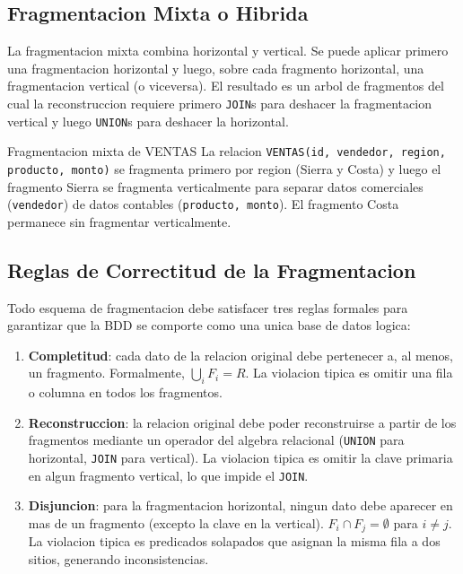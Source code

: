\documentclass[11pt,a4paper]{article}
\begin{document}
\subsection{Fragmentacion Mixta o Hibrida}

La fragmentacion mixta combina horizontal y vertical. Se puede aplicar primero una fragmentacion horizontal y luego, sobre cada fragmento horizontal, una fragmentacion vertical (o viceversa). El resultado es un arbol de fragmentos del cual la reconstruccion requiere primero \texttt{JOIN}s para deshacer la fragmentacion vertical y luego \texttt{UNION}s para deshacer la horizontal.

\begin{examplebox}{Fragmentacion mixta de VENTAS}
La relacion \texttt{VENTAS(id, vendedor, region, producto, monto)} se fragmenta primero por region (Sierra y Costa) y luego el fragmento Sierra se fragmenta verticalmente para separar datos comerciales (\texttt{vendedor}) de datos contables (\texttt{producto, monto}). El fragmento Costa permanece sin fragmentar verticalmente.
\end{examplebox}

\subsection{Reglas de Correctitud de la Fragmentacion}

Todo esquema de fragmentacion debe satisfacer tres reglas formales para garantizar que la BDD se comporte como una unica base de datos logica:

\begin{enumerate}[label=\textbf{C\arabic*.},leftmargin=*]
\item \textbf{Completitud}: cada dato de la relacion original debe pertenecer a, al menos, un fragmento. Formalmente, $\bigcup_i F_i = R$. La violacion tipica es omitir una fila o columna en todos los fragmentos.
\item \textbf{Reconstruccion}: la relacion original debe poder reconstruirse a partir de los fragmentos mediante un operador del algebra relacional (\texttt{UNION} para horizontal, \texttt{JOIN} para vertical). La violacion tipica es omitir la clave primaria en algun fragmento vertical, lo que impide el \texttt{JOIN}.
\item \textbf{Disjuncion}: para la fragmentacion horizontal, ningun dato debe aparecer en mas de un fragmento (excepto la clave en la vertical). $F_i \cap F_j = \emptyset$ para $i \neq j$. La violacion tipica es predicados solapados que asignan la misma fila a dos sitios, generando inconsistencias.
\end{enumerate}
\end{document}
